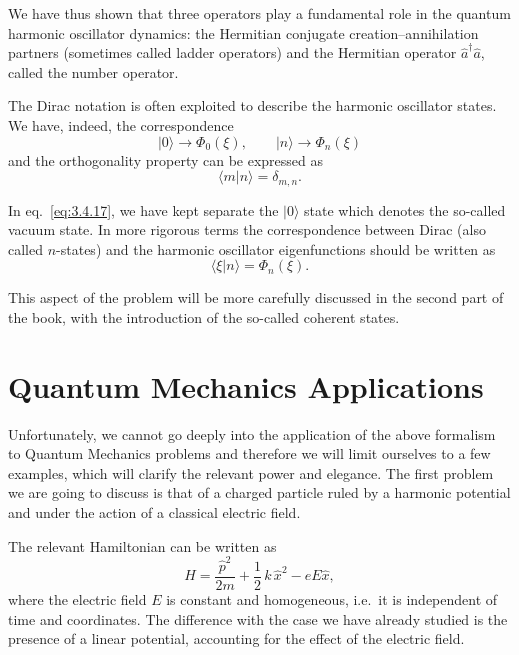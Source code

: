 We have thus shown that three operators play a fundamental role in
the quantum harmonic oscillator dynamics: the Hermitian conjugate
creation--annihilation partners (sometimes called ladder
operators) and the Hermitian operator $\hat a^\dagger\hat a$, called
the number operator.

The Dirac notation is often exploited to describe the harmonic
oscillator states. We have, indeed, the correspondence
\begin{equation}
|0\rangle\to\Phi_0(\xi),\qquad
|n\rangle\to\Phi_n(\xi)
\label{eq:3.4.17}
\end{equation}
and the orthogonality property can be expressed as
\begin{equation}
\langle m|n\rangle=\delta_{m,n}.
\label{eq:3.4.18}
\end{equation}

In eq.~\eqref{eq:3.4.17}, we have kept separate the $|0\rangle$
state which denotes the so-called vacuum state. In more rigorous
terms the correspondence between Dirac (also called $n$-states)
and the harmonic oscillator eigenfunctions should be written as
\begin{equation}
\langle \xi|n\rangle=\Phi_n(\xi).
\label{eq:3.4.19}
\end{equation}

This aspect of the problem will be more carefully discussed in the
second part of the book, with the introduction of the so-called
coherent states.

\section{Quantum Mechanics Applications}
\label{sec:3.5}

Unfortunately, we cannot go deeply into the application of the above
formalism to Quantum Mechanics problems and therefore we will limit
ourselves to a few examples, which will clarify the relevant power
and elegance. The first problem we are going to discuss is that of a
charged particle ruled by a harmonic potential and under the action
of a classical electric field.

The relevant Hamiltonian can be written as
\begin{equation}
\hat H=\frac{\hat p^2}{2m}+\frac{1}{2}\,k\,\hat x^2-eE\hat x,
\label{eq:3.5.1}
\end{equation}
where the electric field $E$ is constant and homogeneous, i.e.\ it is
independent of time and coordinates. The difference with the case we
have already studied is the presence of a linear potential,
accounting for the effect of the electric field.

